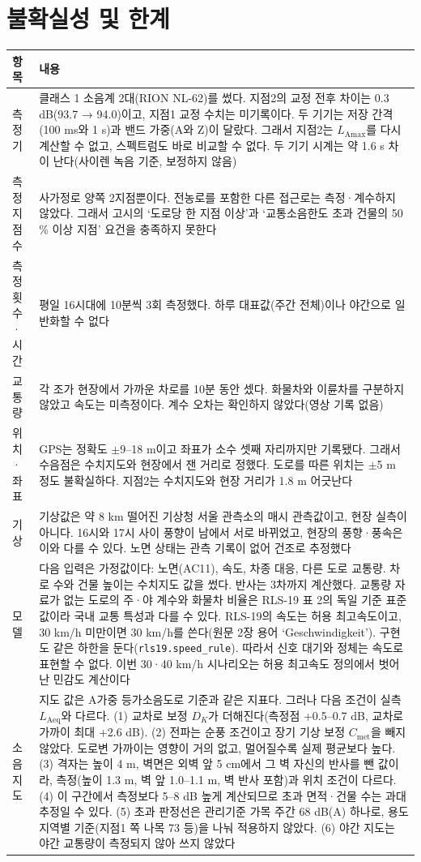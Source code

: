 \documentclass[10.5pt,a4paper]{article}
\newcommand{\Laeq}{\ensuremath{L_{\mathrm{Aeq}}}}
\newcommand{\hd}[1]{\cellcolor{headfill}\textbf{\sffamily #1}}
\begin{document}
\section{불확실성 및 한계}
\footnotesize
\begin{longtable}{L{0.17}L{0.83}}
\toprule
\hd{항목} & \hd{내용} \\ \midrule
\endhead
\bottomrule
\endlastfoot
측정기 & 클래스 1 소음계 2대(RION NL-62)를 썼다. 지점2의 교정 전후 차이는 0.3 dB(93.7 → 94.0)이고, 지점1 교정 수치는 미기록이다. 두 기기는 저장 간격(100 ms와 1 s)과 밴드 가중(A와 Z)이 달랐다. 그래서 지점2는 $L_{\mathrm{Amax}}$를 다시 계산할 수 없고, 스펙트럼도 바로 비교할 수 없다. 두 기기 시계는 약 1.6 s 차이 난다(사이렌 녹음 기준, 보정하지 않음) \\ \midrule
측정 지점 수 & 사가정로 양쪽 2지점뿐이다. 전농로를 포함한 다른 접근로는 측정·계수하지 않았다. 그래서 고시의 `도로당 한 지점 이상'과 `교통소음한도 초과 건물의 50 \% 이상 지점' 요건을 충족하지 못한다 \\ \midrule
측정 횟수·시간 & 평일 16시대에 10분씩 3회 측정했다. 하루 대표값(주간 전체)이나 야간으로 일반화할 수 없다 \\ \midrule
교통량 & 각 조가 현장에서 가까운 차로를 10분 동안 셌다. 화물차와 이륜차를 구분하지 않았고 속도는 미측정이다. 계수 오차는 확인하지 않았다(영상 기록 없음) \\ \midrule
위치·좌표 & GPS는 정확도 $\pm$9--18 m이고 좌표가 소수 셋째 자리까지만 기록됐다. 그래서 수음점은 수치지도와 현장에서 잰 거리로 정했다. 도로를 따른 위치는 $\pm$5 m 정도 불확실하다. 지점2는 수치지도와 현장 거리가 1.8 m 어긋난다 \\ \midrule
기상 & 기상값은 약 8 km 떨어진 기상청 서울 관측소의 매시 관측값이고, 현장 실측이 아니다. 16시와 17시 사이 풍향이 남에서 서로 바뀌었고, 현장의 풍향·풍속은 이와 다를 수 있다. 노면 상태는 관측 기록이 없어 건조로 추정했다 \\ \midrule
모델 & 다음 입력은 가정값이다: 노면(AC11), 속도, 차종 대응, 다른 도로 교통량. 차로 수와 건물 높이는 수치지도 값을 썼다. 반사는 3차까지 계산했다. 교통량 자료가 없는 도로의 주·야 계수와 화물차 비율은 RLS-19 표 2의 독일 기준 표준값이라 국내 교통 특성과 다를 수 있다. RLS-19의 속도는 허용 최고속도이고, 30 km/h 미만이면 30 km/h를 쓴다(원문 2장 용어 `Geschwindigkeit'). 구현도 같은 하한을 둔다(\texttt{rls19.speed\_rule}). 따라서 신호 대기와 정체는 속도로 표현할 수 없다. 이번 30·40 km/h 시나리오는 허용 최고속도 정의에서 벗어난 민감도 계산이다 \\ \midrule
소음지도 & 지도 값은 A가중 등가소음도로 기준과 같은 지표다. 그러나 다음 조건이 실측 \Laeq 와 다르다. (1) 교차로 보정 $D_K$가 더해진다(측정점 +0.5--0.7 dB, 교차로 가까이 최대 +2.6 dB). (2) 전파는 순풍 조건이고 장기 기상 보정 $C_{\mathrm{met}}$을 빼지 않았다. 도로변 가까이는 영향이 거의 없고, 멀어질수록 실제 평균보다 높다. (3) 격자는 높이 4 m, 벽면은 외벽 앞 5 cm에서 그 벽 자신의 반사를 뺀 값이라, 측정(높이 1.3 m, 벽 앞 1.0--1.1 m, 벽 반사 포함)과 위치 조건이 다르다. (4) 이 구간에서 측정보다 5--8 dB 높게 계산되므로 초과 면적·건물 수는 과대 추정일 수 있다. (5) 초과 판정선은 관리기준 가목 주간 68 dB(A) 하나로, 용도지역별 기준(지점1 쪽 나목 73 등)을 나눠 적용하지 않았다. (6) 야간 지도는 야간 교통량이 측정되지 않아 쓰지 않았다 \\
\end{longtable}
\end{document}
